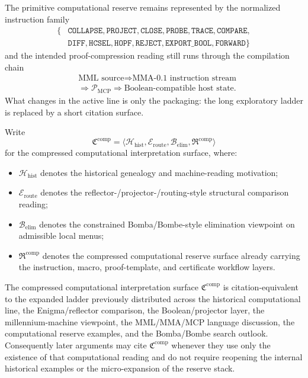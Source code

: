 The primitive computational reserve remains represented by the normalized instruction family
\[
\begin{aligned}
\{&\texttt{COLLAPSE},\texttt{PROJECT},\texttt{CLOSE},\texttt{PROBE},\texttt{TRACE},\texttt{COMPARE},\\
&\texttt{DIFF},\texttt{HCSEL},\texttt{HOPF},\texttt{REJECT},\texttt{EXPORT\_BOOL},\texttt{FORWARD}\}
\end{aligned}
\]
and the intended proof-compression reading still runs through the compilation chain
\[
\begin{aligned}
&\text{MML source}
\Longrightarrow \text{MMA-0.1 instruction stream}\\
&\Longrightarrow \mathcal P_{\mathrm{MCP}}
\Longrightarrow \text{Boolean-compatible host state}.
\end{aligned}
\]
What changes in the active line is only the packaging: the long exploratory ladder is replaced by a short citation surface.

\begin{definition}
Write
\[
\mathfrak C^{\mathrm{comp}}
=
\langle
\mathcal H_{\mathrm{hist}},
\mathcal E_{\mathrm{route}},
\mathcal B_{\mathrm{elim}},
\mathfrak R^{\mathrm{comp}}
\rangle
\]
for the compressed computational interpretation surface, where:
\begin{itemize}[leftmargin=2em]
 \item $\mathcal H_{\mathrm{hist}}$ denotes the historical genealogy and machine-reading motivation;
 \item $\mathcal E_{\mathrm{route}}$ denotes the reflector-/projector-/routing-style structural comparison reading;
 \item $\mathcal B_{\mathrm{elim}}$ denotes the constrained Bomba/Bombe-style elimination viewpoint on admissible local menus;
 \item $\mathfrak R^{\mathrm{comp}}$ denotes the compressed computational reserve surface already carrying the instruction, macro, proof-template, and certificate workflow layers.
\end{itemize}
\end{definition}

\begin{proposition}
The compressed computational interpretation surface $\mathfrak C^{\mathrm{comp}}$ is citation-equivalent to the expanded ladder previously distributed across the historical computational line, the Enigma/reflector comparison, the Boolean/projector layer, the millennium-machine viewpoint, the MML/MMA/MCP language discussion, the computational reserve examples, and the Bomba/Bombe search outlook. Consequently later arguments may cite $\mathfrak C^{\mathrm{comp}}$ whenever they use only the existence of that computational reading and do not require reopening the internal historical examples or the micro-expansion of the reserve stack.
\end{proposition}

